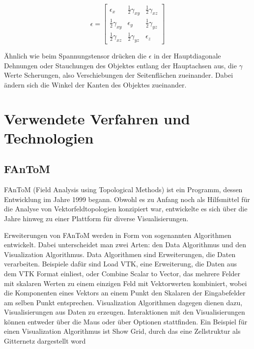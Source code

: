 \documentclass[a4paper,fontsize=12pt,toc=bib,parskip=half,ngerman]{scrartcl}
\begin{document}
\begin{equation}
	\epsilon  =  
	\begin{bmatrix}
		\epsilon_x & \frac{1}{2}\gamma_{xy} & \frac{1}{2}\gamma_{xz}\\
		\frac{1}{2}\gamma_{xy} & \epsilon_y & \frac{1}{2}\gamma_{yz}\\
		\frac{1}{2}\gamma_{xz} & \frac{1}{2}\gamma_{yz} & \epsilon_z
	\end{bmatrix}
\end{equation}

\"Ahnlich wie beim Spannungstensor dr\"ucken die $\epsilon$ in der Hauptdiagonale Dehnungen oder Stauchungen des Objektes entlang der Hauptachsen aus, die $\gamma$ Werte Scherungen, also Verschiebungen der Seitenfl\"achen zueinander. Dabei \"andern sich die Winkel der Kanten des Objektes zueinander.

\section{Verwendete Verfahren und Technologien}
\label{sec:Technologien}
\subsection{FAnToM}
FAnToM\cite{fantomWebsite,wiebel2009fantom} (\glqq Field Analysis using Topological Methods\grqq{}) ist ein Programm, dessen Entwicklung im Jahre 1999 begann. Obwohl es zu Anfang noch als Hilfsmittel f\"ur die Analyse von Vektorfeldtopologien konzipiert war, entwickelte es sich \"uber die Jahre hinweg zu einer Plattform f\"ur diverse Visualisierungen.

Erweiterungen von FAnToM werden in Form von sogenannten \glq Algorithmen\grq{} entwickelt. Dabei unterscheidet man zwei Arten: den \glq Data Algorithmus\grq{} und den \glq Visualization Algorithmus\grq{}. Data Algorithmen sind Erweiterungen, die Daten verarbeiten. Beispiele daf\"ur sind \glq Load VTK\grq{}, eine Erweiterung, die Daten aus dem VTK Format einliest, oder \glq Combine Scalar to Vector\grq{}, das mehrere Felder mit skalaren Werten zu einem einzigen Feld mit Vektorwerten kombiniert, wobei die Komponenten eines Vektors an einem Punkt den Skalaren der Eingabefelder am selben Punkt entsprechen.
Visualization Algorithmen dagegen dienen dazu, Visualisierungen aus Daten zu erzeugen. Interaktionen mit den Visualisierungen k\"onnen entweder \"uber die Maus oder \"uber Optionen stattfinden. Ein Beispiel f\"ur einen Visualization Algorithmus ist \glq Show Grid\grq{}, durch das eine Zellstruktur als Gitternetz dargestellt word
\end{document}
